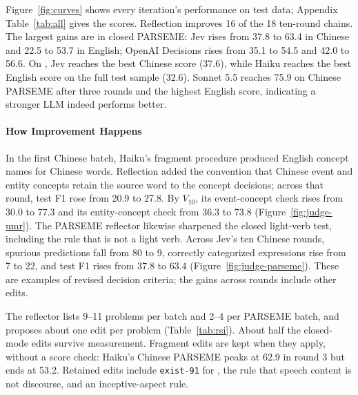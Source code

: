 \begin{table}[t]
\centering\small
\setlength{\tabcolsep}{2.6pt}
\resizebox{\columnwidth}{!}{}
\caption{Ten rounds of reflection: problems the reflector listed, edits tried (with closed-mode retries), edits kept, compressions, and the size of the editable procedure (characters; closed mode includes code).}
\label{tab:rsi}
\end{table}

Figure~\ref{fig:curves} shows every iteration's performance on test data; Appendix Table~\ref{tab:all} gives the scores. Reflection improves 16 of the 18 ten-round chains. The largest gains are in closed PARSEME: Jev rises from 37.8 to 63.4 in Chinese and 22.5 to 53.7 in English; OpenAI Decisions rises from 35.1 to 54.5 and 42.0 to 56.6. On \umr, Jev reaches the best Chinese score (37.6), while Haiku reaches the best English score on the full test sample (32.6). Sonnet 5.5 reaches 75.9 on Chinese PARSEME after three rounds and the highest English \umr score, indicating a stronger LLM indeed performs better.

\paragraph{How Improvement Happens}
In the first Chinese \umr batch, Haiku's fragment procedure produced English concept names for Chinese words. Reflection added the convention that Chinese event and entity concepts retain the source word to the concept decisions; across that round, test \jm{} F1 rose from 20.9 to 27.8. By $V_{10}$, its event-concept check rises from 30.0 to 77.3 and its entity-concept check from 36.3 to 73.8 (Figure~\ref{fig:judge-umr}). The PARSEME reflector likewise sharpened the closed light-verb test, including the rule that  is not a light verb. Across Jev's ten Chinese rounds, spurious predictions fall from 80 to 9, correctly categorized expressions rise from 7 to 22, and test F1 rises from 37.8 to 63.4 (Figure~\ref{fig:judge-parseme}). These are examples of revised decision criteria; the gains across rounds include other edits.

The reflector lists 9--11 problems per \umr batch and 2--4 per PARSEME batch, and proposes about one edit per problem (Table~\ref{tab:rsi}). About half the closed-mode edits survive measurement. Fragment edits are kept when they apply, without a score check: Haiku's Chinese PARSEME peaks at 62.9 in round 3 but ends at 53.2. Retained edits include \texttt{exist-91} for , the rule that speech content is not discourse, and an inceptive-aspect rule.

